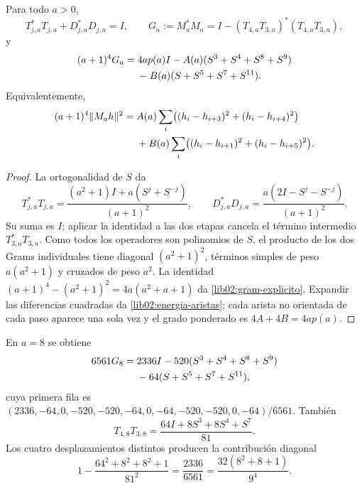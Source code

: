 \begin{proposition}
\label{lib02:gram}
Para todo \(a>0\),
\[
 T_{j,a}^*T_{j,a}+D_{j,a}^*D_{j,a}=I,\qquad
 G_a:=M_a^*M_a=I-(T_{4,a}T_{3,a})^*(T_{4,a}T_{3,a}),
\]
y
\begin{align}
 (a+1)^4G_a={}&4ap(a)I
 -A(a)(S^3+S^4+S^8+S^9)\notag\\
 &-B(a)(S+S^5+S^7+S^{11}).
 \label{lib02:gram-explicito}
\end{align}
Equivalentemente,
\begin{align}
 (a+1)^4\|M_ah\|^2={}&A(a)\sum_i
 \bigl((h_i-h_{i+3})^2+(h_i-h_{i+4})^2\bigr)\notag\\
 &+B(a)\sum_i
 \bigl((h_i-h_{i+1})^2+(h_i-h_{i+5})^2\bigr).
 \label{lib02:energia-aristas}
\end{align}
\end{proposition}
\begin{proof}
La ortogonalidad de \(S\) da
\[
 T_{j,a}^*T_{j,a}
 =\frac{(a^2+1)I+a(S^j+S^{-j})}{(a+1)^2},\qquad
 D_{j,a}^*D_{j,a}
 =\frac{a(2I-S^j-S^{-j})}{(a+1)^2}.
\]
Su suma es \(I\); aplicar la identidad a las dos etapas cancela el
término intermedio \(T_{3,a}^*T_{3,a}\). Como todos los operadores
son polinomios de \(S\), el producto de los dos Grams individuales
tiene diagonal \((a^2+1)^2\), términos simples de peso
\(a(a^2+1)\) y cruzados de peso \(a^2\). La identidad
\((a+1)^4-(a^2+1)^2=4a(a^2+a+1)\) da
\eqref{lib02:gram-explicito}. Expandir las diferencias cuadradas da
\eqref{lib02:energia-aristas}; cada arista no orientada de cada paso
aparece una sola vez y el grado ponderado es \(4A+4B=4ap(a)\).
\end{proof}

En \(a=8\) se obtiene
\begin{align}
 6561G_8={}&2336I-520(S^3+S^4+S^8+S^9)\notag\\
 &-64(S+S^5+S^7+S^{11}),
 \label{lib02:gram-nonadico}
\end{align}
cuya primera fila es
\((2336,-64,0,-520,-520,-64,0,-64,-520,-520,0,-64)/6561\).
También
\[
 T_{4,8}T_{3,8}=\frac{64I+8S^3+8S^4+S^7}{81}.
\]
Los cuatro desplazamientos distintos producen la contribución diagonal
\[
 1-\frac{64^2+8^2+8^2+1}{81^2}
 =\frac{2336}{6561}
 =\frac{32(8^2+8+1)}{9^4}.
\]

